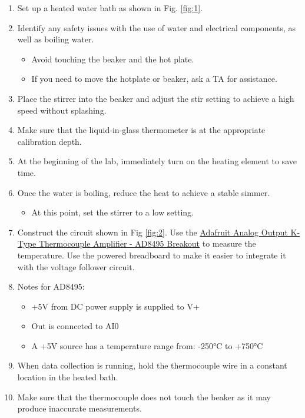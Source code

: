 \documentclass{article} %
\begin{document}
\begin{enumerate}
    \item Set up a heated water bath as shown in Fig. \ref{fig:1}.
    \item Identify any safety issues with the use of water and electrical components, as well as boiling water. 
    \begin{itemize}
        \item Avoid touching the beaker and the hot plate.
        \item If you need to move the hotplate or beaker, ask a TA for assistance.
    \end{itemize}
    \item Place the stirrer into the beaker and adjust the stir setting to achieve a high speed without splashing.
    \item Make sure that the liquid-in-glass thermometer is at the appropriate calibration depth. 
    \item At the beginning of the lab, immediately turn on the heating element to save time. 
    \item Once the water is boiling, reduce the heat to achieve a stable simmer. 
    \begin{itemize}
        \item At this point, set the stirrer to a low setting.
    \end{itemize}
    \item Construct the circuit shown in Fig \ref{fig:2}. Use the \href{https://www.adafruit.com/product/1778?srsltid=AfmBOoqEDJf5GsTsR4Gr9LmLwYLw-Nv4yd97p6g4jvmZ-DXAxlDykVBP}{Adafruit Analog Output K-Type Thermocouple Amplifier - AD8495 Breakout} to measure the temperature. Use the powered breadboard to make it easier to integrate it with the voltage follower circuit. 
    \item Notes for AD8495:
    \begin{itemize}
        \item +5V from DC power supply is supplied to V+
        \item Out is connceted to AI0
        \item A +5V source has a temperature range from: -250°C to +750°C
    \end{itemize}
    \item When data collection is running, hold the thermocouple wire in a constant location in the heated bath. 
    \item Make sure that the thermocouple does not touch the beaker as it may produce inaccurate measurements.
\end{enumerate}
\end{document}
